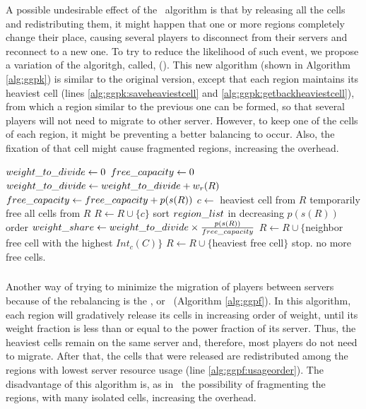 A possible undesirable effect of the \ggp\ algorithm is that by releasing all the cells and redistributing them, it might happen that one or more regions completely change their place, causing several players to disconnect from their servers and reconnect to a new one. To try to reduce the likelihood of such event, we propose a variation of the algoritgh, called, \textbf{\ggpk} (\ggpkmeaning). This new algorithm (shown in Algorithm \ref{alg:ggpk}) is similar to the original version, except that each region maintains its heaviest cell (lines \ref{alg:ggpk:saveheaviestcell} and \ref{alg:ggpk:getbackheaviestcell}), from which a region similar to the previous one can be formed, so that several players will not need to migrate to other server. However, to keep one of the cells of each region, it might be preventing a better balancing to occur. Also, the fixation of that cell might cause fragmented regions, increasing the overhead.

\begin{algorithm}
\caption{\ggpk}
\label{alg:ggpk}
\begin{algorithmic}[1]
	 \STATE $weight\_to\_divide \leftarrow 0$
	 \STATE $free\_capacity \leftarrow 0$
	 		\STATE $weight\_to\_divide \leftarrow weight\_to\_divide + w_r(R)$
	 		\STATE $free\_capacity \leftarrow free\_capacity + p(s(R))$
	 		\STATE $c \leftarrow $ heaviest cell from $R$ \label{alg:ggpk:saveheaviestcell}
	 		\STATE temporarily free all cells from $R$
	 		\STATE $R \leftarrow R \cup \{c\}$ \label{alg:ggpk:getbackheaviestcell}
	 \ENDFOR
	 \STATE sort $region\_list$ in decreasing $p(s(R))$ order \label{alg:ggp:sortregions}
	 		\STATE $weight\_share \leftarrow weight\_to\_divide \times \frac{p(s(R))}{free\_capacity}$
	 		 \label{alg:ggpk:whilefraction}
	 		   		\STATE $R \leftarrow R \cup \{$neighbor free cell with the highest $Int_c(C)$$\}$
	 		   		\STATE $R \leftarrow R \cup \{$heaviest free cell$\}$ \label{alg:ggpk:freeheavycell}
	 		   \ELSE
	 		   		\STATE stop. no more free cells.
	 		   \ENDIF
	 		\ENDWHILE
	 \ENDFOR
\end{algorithmic}
\end{algorithm}

\subsubsection{\ggpf} %
Another way of trying to minimize the migration of players between servers because of the rebalancing is the \textbf{\ggpf}, or \ggpfmeaning\ (Algorithm \ref{alg:ggpf}). In this algorithm, each region will gradatively release its cells in increasing order of weight, until its weight fraction is less than or equal to the power fraction of its server. Thus, the heaviest cells remain on the same server and, therefore, most players do not need to migrate. After that, the cells that were released are redistributed among the regions with lowest server resource usage (line \ref{alg:ggpf:usageorder}). The disadvantage of this algorithm is, as in \ggpk\, the possibility of fragmenting the regions, with many isolated cells, increasing the overhead.

